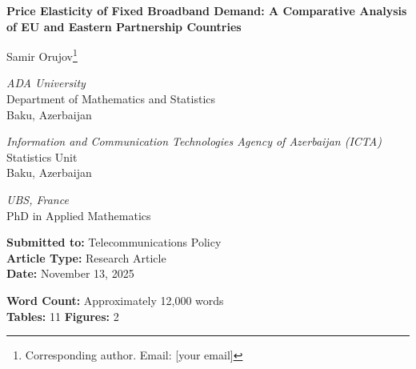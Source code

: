 \documentclass[12pt]{article}
\begin{document}
\thispagestyle{empty}

\begin{center}

\vspace*{2cm}
{\LARGE\bfseries Price Elasticity of Fixed Broadband Demand: A Comparative Analysis of EU and Eastern Partnership Countries}

\vspace{1.5cm}

{\large
Samir Orujov\footnote{Corresponding author. Email: [your email]}\\
}

\vspace{0.5cm}

{\normalsize
\textit{ADA University}\\
Department of Mathematics and Statistics\\
Baku, Azerbaijan\\
}

\vspace{0.3cm}

{\normalsize
\textit{Information and Communication Technologies Agency of Azerbaijan (ICTA)}\\
Statistics Unit\\
Baku, Azerbaijan\\
}

\vspace{0.3cm}

{\normalsize
\textit{UBS, France}\\
PhD in Applied Mathematics\\
}

\vspace{2cm}

{\normalsize
\textbf{Submitted to:} Telecommunications Policy\\
\textbf{Article Type:} Research Article\\
\textbf{Date:} November 13, 2025\\
}

\vspace{2cm}

{\small
\textbf{Word Count:} Approximately 12,000 words\\
\textbf{Tables:} 11 \quad \textbf{Figures:} 2\\
}

\end{center}

\vfill
\end{document}
